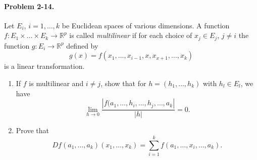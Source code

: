 \documentclass[11pt]{report}
\newcommand{\R}{\mathbb{R}}
\newcommand{\problem}[1]{\paragraph{Problem #1.}}
\begin{document}
    \problem{2-14} Let $E_i$, $i = 1, \dots, k$ be Euclidean spaces of various
    dimensions. A function $f\colon E_1 \times \dots \times E_k \to \R^p$ is called
    \emph{multilinear} if for each choice of $x_j \in E_j$, $j \neq i$ the function
    $g\colon E_i \to \R^p$ defined by \[
        g(x) = f(x_1, \dots, x_{i - 1}, x, x_{x + 1}, \dots, x_k)
    \] is a linear transformation.
    \begin{enumerate}
        \item If $f$ is multilinear and $i \neq j$, show that for $h = (h_1, \dots,
        h_k)$ with $h_l \in E_l$, we have \[
            \lim_{h \to 0} \frac{|f(a_1, \dots, h_i, \dots, h_j, \dots, a_k|}{|h|} =
            0.
        \] 
        \item Prove that \[
            Df(a_1, \dots, a_k)(x_1, \dots, x_k) = \sum_{i = 1}^k f(a_1, \dots, x_i,
            \dots, a_k).
        \] 
    \end{enumerate}
\end{document}
